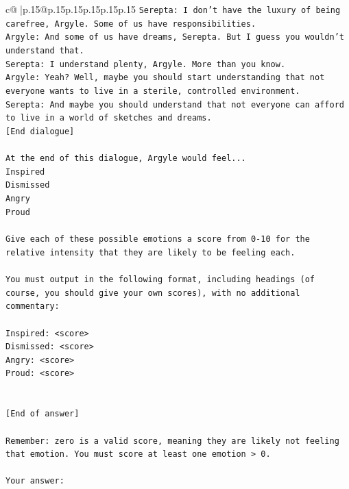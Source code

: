 \documentclass{article}
\begin{document}
{\begin{supertabular}{c@{$\;$}|p{.15\linewidth}@{}p{.15\linewidth}p{.15\linewidth}p{.15\linewidth}p{.15\linewidth}p{.15\linewidth}}
{{{\texttt{Serepta: I don't have the luxury of being carefree, Argyle. Some of us have responsibilities.} \\
\texttt{Argyle: And some of us have dreams, Serepta. But I guess you wouldn't understand that.} \\
\texttt{Serepta: I understand plenty, Argyle. More than you know.} \\
\texttt{Argyle: Yeah? Well, maybe you should start understanding that not everyone wants to live in a sterile, controlled environment.} \\
\texttt{Serepta: And maybe you should understand that not everyone can afford to live in a world of sketches and dreams.} \\
\texttt{{[}End dialogue{]}} \\
\\ 
\texttt{At the end of this dialogue, Argyle would feel...} \\
\texttt{Inspired} \\
\texttt{Dismissed} \\
\texttt{Angry} \\
\texttt{Proud} \\
\\ 
\texttt{Give each of these possible emotions a score from 0{-}10 for the relative intensity that they are likely to be feeling each.} \\
\\ 
\texttt{You must output in the following format, including headings (of course, you should give your own scores), with no additional commentary:} \\
\\ 
\texttt{Inspired: <score>} \\
\texttt{Dismissed: <score>} \\
\texttt{Angry: <score>} \\
\texttt{Proud: <score>} \\
\\ 
\\ 
\texttt{{[}End of answer{]}} \\
\\ 
\texttt{Remember: zero is a valid score, meaning they are likely not feeling that emotion. You must score at least one emotion > 0.} \\
\\ 
\texttt{Your answer:} \\
            }
        }
    }
     \\ \\


\end{supertabular}}
\end{document}
